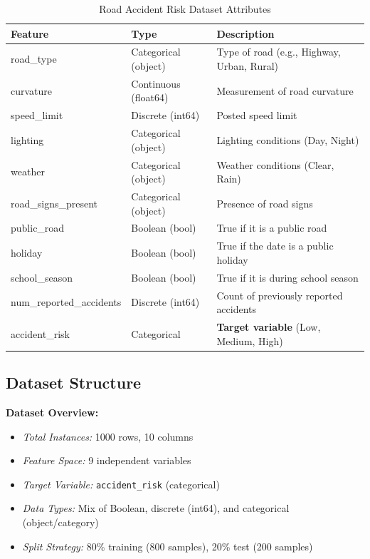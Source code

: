 \documentclass[12pt,a4paper]{article}
\begin{document}
\begin{table}[H]
    \centering
    \sffamily %
    \caption{Road Accident Risk Dataset Attributes}
    \label{tab:attributes}
    \begin{tabularx}{\textwidth}{l l X}
        \toprule
        \textbf{Feature} & \textbf{Type} & \textbf{Description} \\
    \midrule
    road\_type & Categorical (object) & Type of road (e.g., Highway, Urban, Rural) \\
    \midrule
        curvature & Continuous (float64) & Measurement of road curvature \\
    \midrule
        speed\_limit & Discrete (int64) & Posted speed limit \\
    \midrule
        lighting & Categorical (object) & Lighting conditions (Day, Night) \\
    \midrule
        weather & Categorical (object) & Weather conditions (Clear, Rain) \\
    \midrule
        road\_signs\_present & Categorical (object) & Presence of road signs \\
    \midrule
        public\_road & Boolean (bool) & True if it is a public road \\
    \midrule
        holiday & Boolean (bool) & True if the date is a public holiday \\
    \midrule
        school\_season & Boolean (bool) & True if it is during school season \\
    \midrule
        num\_reported\_accidents & Discrete (int64) & Count of previously reported accidents \\
    \midrule
        accident\_risk & Categorical & \textbf{Target variable} (Low, Medium, High) \\
        \bottomrule
    \end{tabularx}
\end{table}

\subsection{Dataset Structure}

\begin{infobox}
\textbf{Dataset Overview:}
\begin{itemize}
    \item \textit{Total Instances:} 1000 rows, 10 columns
    \item \textit{Feature Space:} 9 independent variables
    \item \textit{Target Variable:} \texttt{accident\_risk} (categorical)
    \item \textit{Data Types:} Mix of Boolean, discrete (int64), and categorical (object/category)
    \item \textit{Split Strategy:} 80\% training (800 samples), 20\% test (200 samples)
\end{itemize}
\end{infobox}
\end{document}
